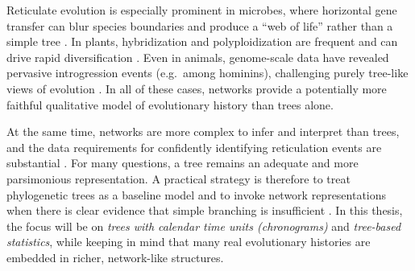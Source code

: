 

Reticulate evolution is especially prominent in microbes, where horizontal gene transfer can blur species boundaries and produce a ``web of life'' rather than a simple tree \citep{moore_convergent_1997,doolittle_phylogenetic_1999,kurland_horizontal_2003, bapteste_networks_2013}. In plants, hybridization and polyploidization are frequent and can drive rapid diversification \citep{linder_reconstructing_2004, marhold_polyploidy_2006}. Even in animals, genome-scale data have revealed pervasive introgression events (e.g.\ among hominins), challenging purely tree-like views of evolution \citep{racimo_evidence_2015,martin_interpreting_2017}. In all of these cases, networks provide a potentially more faithful qualitative model of evolutionary history than trees alone.

At the same time, networks are more complex to infer and interpret than trees, and the data requirements for confidently identifying reticulation events are substantial \citep{huson_application_2006}. For many questions, a tree remains an adequate and more parsimonious representation. A practical strategy is therefore to treat phylogenetic trees as a baseline model and to invoke network representations when there is clear evidence that simple branching is insufficient \citep{warnow_advances_2019, hibbins_phylogenomic_2022}. In this thesis, the focus will be on \emph{trees with calendar time units (chronograms)} and \emph{tree-based statistics}, while keeping in mind that many real evolutionary histories are embedded in richer, network-like structures. 

\clearpage
